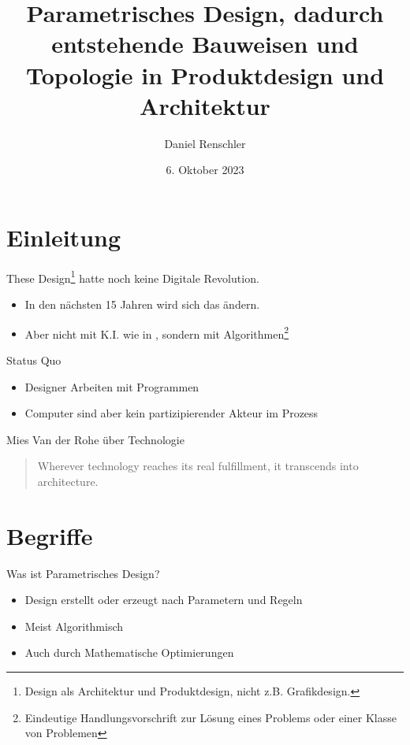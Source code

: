 \documentclass{beamer}
\title{Parametrisches Design, dadurch entstehende Bauweisen und Topologie in Produktdesign und Architektur}
\author{Daniel Renschler}
\date{6. Oktober 2023}
\begin{document}
\begin{frame}
    \titlepage 
\end{frame}


\section{Einleitung}
\begin{frame}{These}
Design\footnote{Design als Architektur und Produktdesign, nicht z.B.
Grafikdesign.} hatte noch keine Digitale Revolution.

\begin{itemize}
    \item In den nächsten 15 Jahren wird sich das ändern.

    \item Aber nicht mit K.I. wie in \parencite{oppenlaender2022}, sondern mit
        Algorithmen\footnote{Eindeutige Handlungsvorschrift zur Lösung
        eines Problems oder einer Klasse von Problemen}
\end{itemize}
\end{frame}


\begin{frame}{Status Quo}
   \begin{itemize}
       \item Designer Arbeiten mit Programmen
       \item Computer sind aber kein partizipierender Akteur im Prozess
   \end{itemize} 
\end{frame}


\begin{frame}
    \tableofcontents
\end{frame}

\begin{frame}{Mies Van der Rohe \"uber Technologie}
    \begin{quote}
        Wherever technology reaches its real fulfillment, it transcends into architecture.
    \end{quote}
\end{frame}


\section{Begriffe}
\begin{frame}{Was ist Parametrisches Design?}
    \begin{itemize}
        \item Design erstellt oder erzeugt nach Parametern und Regeln
        \item Meist Algorithmisch
        \item Auch durch Mathematische Optimierungen
    \end{itemize}
\end{frame}
\end{document}
